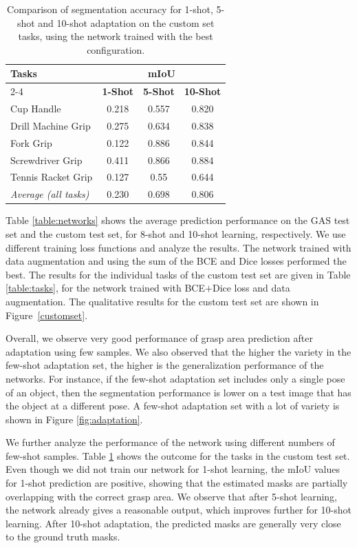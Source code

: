 \documentclass[letterpaper]{article} %
\begin{document}
\begin{table}[h!]
\centering
\caption{Comparison of segmentation accuracy for 1-shot, 5-shot and 10-shot adaptation on the custom set tasks, using the network trained with the best configuration.}
\begin{tabular}{|p{3.3cm}|c|c|c|}
 \hline
 \multirow{2}{*}{\textbf{Tasks}} & \multicolumn{3}{c|}{\textbf{mIoU}} \\ \cline{2-4}
 & \textbf{1-Shot}  & \textbf{5-Shot} & \textbf{10-Shot} \\
 \hline
 Cup Handle & 0.218 & 0.557 & 0.820 \\ 
 \hline
 Drill Machine Grip & 0.275 & 0.634 & 0.838 \\ 
 \hline
 Fork Grip & 0.122 & 0.886 & 0.844 \\ 
 \hline
 Screwdriver Grip & 0.411 & 0.866 & 0.884\\
 \hline
 Tennis Racket Grip & 0.127 & 0.55 & 0.644 \\
 \hline
 \textit{Average (all tasks)} & 0.230 & 0.698 & 0.806 \\
 \hline
\end{tabular}
\label{table:shots}
\end{table}

Table \ref{table:networks} shows the average prediction performance on the GAS test set and the custom test set,  for 8-shot and 10-shot learning, respectively. We use different training loss functions and analyze the results. The network trained with data augmentation and using the sum of the BCE and Dice losses performed the best. The results for the individual tasks of the custom test set are given in Table \ref{table:tasks}, for the network trained with BCE$ + $Dice loss and data augmentation. The qualitative results for the custom test set are shown in Figure~\ref{customset}.

Overall, we observe very good performance of grasp area prediction after adaptation using few samples. We also observed that the higher the variety in the few-shot adaptation set, the higher is the generalization performance of the networks. For instance, if the few-shot adaptation set includes only a single pose of an object, then the segmentation performance is lower on a test image that has the object at a different pose. A few-shot adaptation set with a lot of variety is shown in Figure \ref{fig:adaptation}.

We further analyze the performance of the network using different numbers of few-shot samples. Table \ref{table:shots} shows the outcome for the tasks in the custom test set. Even though we did not train our network for 1-shot learning, the mIoU values for 1-shot prediction are positive, showing that the estimated masks are partially overlapping with the correct grasp area. We observe that after 5-shot learning, the network already gives a reasonable output, which improves further for 10-shot learning. After 10-shot adaptation, the predicted masks are generally very close to the ground truth masks.
\end{document}
